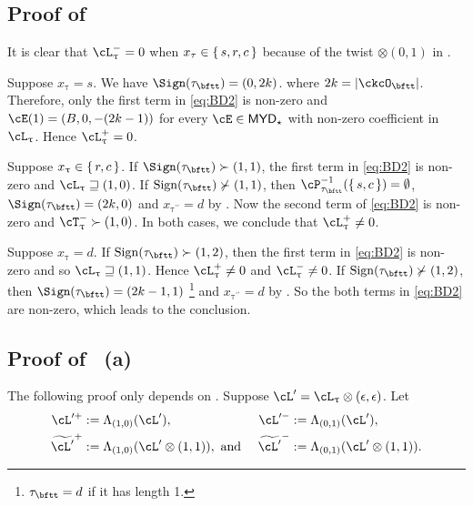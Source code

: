 \documentclass[12pt,a4paper]{amsart}
\def\abs#1{\left|{#1}\right|}
\def\MYD{{\mathsf{MYD}}}
\def\pac#1{\ac_{#1}^+}
\def\nac#1{\ac_{#1}^-}
\def\ac{\cL}
\def\lotimes{\otimes}
\numberwithin{equation}{section}
\theoremstyle{remark}
\def\ssign{\mathrm{Sign}}
\def\ncT{\cT^-}
\def\uptaupp{\uptau^{\prime\prime}}
\begin{document}
\subsection*{\bf Proof of  }


It is clear that $\nac{\uptau}=0$ when $x_{\tau}\in \set{s,r,c}$ because of
the twist $\lotimes(0, 1)$ in .

  \begin{enumPF}
    \item  Suppose $x_{\uptau}=s$. We have $\Sign(\tau_{\bftt})=(0,2k)$.
    where $2k= \abs{\ckcO_{\bftt}}$.
    Therefore, only the first term in  \eqref{eq:BD2} is non-zero and
    $\cE(1) = (B,0,-(2k-1))$ for every $\cE\in \MYD_{\star}$ with non-zero
    coefficient in
    $\ac_{\uptau}$.
    Hence $\pac{\uptau}=0$.
    \item Suppose $x_{\uptau} \in \set{r,c}$. If
    $\Sign(\tau_{\bftt})\succ(1,1)$, the first term in \eqref{eq:BD2} is
    non-zero and $\ac_{\uptau} \sqsupseteq (1,0)$. If
    $\ssign(\tau_{\bftt})\nsucc (1,1)$, then
    $\cP_{\tau_{\bftt}}^{-1}(\set{s,c})=\emptyset$, $\Sign(\tau_{\bftt})=(2k,0)$
    and $x_{\uptaupp}=d$ by . Now the second term of
    \eqref{eq:BD2} is non-zero and $\ncT_{\uptau}\succ (1,0)$.
    In both cases, we conclude that $\pac{\uptau}\neq 0$.
    \item Suppose $x_{\uptau}=d$. If $\ssign(\tau_{\bftt})\succ (1,2)$,
    then the first term in \eqref{eq:BD2} is non-zero and so
    $\ac_{\uptau}\sqsupseteq (1,1)$. Hence $\pac{\uptau}\neq 0$ and
    $\nac{\uptau}\neq 0$.
    If  $\ssign(\tau_{\bftt})\nsucc(1,2)$, then $\Sign(\tau_{\bftt}) = (2k-1,1)$
    \footnote{$\tau_{\bftt}=d$ if it has length 1.} and
    $x_{\uptaupp}=d$ by .
    So the both terms in \eqref{eq:BD2} are non-zero, which leads to the conclusion.
  \end{enumPF}

\subsection*{\bf Proof of ~(a) }
\def\opac{\cL'^+}
\def\onac{\cL'^-}
\def\tpac{\widetilde{\cL'}^+}
\def\tnac{\widetilde{\cL'}^-}
The following proof only depends on .
Suppose $\cL' = \ac_{\uptau}\lotimes (\epsilon,\epsilon)$.
Let
  \begin{align*}
    \opac &:= \Lambda_{(1,0)}(\cL'), &
    \onac &:= \Lambda_{(0,1)}(\cL'), \\
    \tpac &:= \Lambda_{(1,0)}(\cL'\lotimes (1,1)),\text{ and } &
    \tnac &:= \Lambda_{(0,1)}(\cL'\lotimes (1,1)).
  \end{align*}
\end{document}
